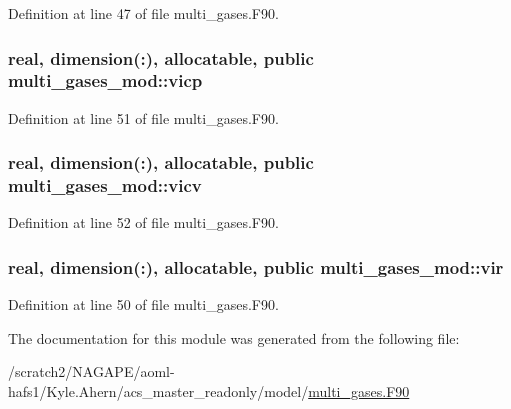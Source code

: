 Definition at line 47 of file multi\-\_\-gases.\-F90.

\subsubsection[{vicp}]{\setlength{\rightskip}{0pt plus 5cm}real, dimension(\-:), allocatable, public multi\-\_\-gases\-\_\-mod\-::vicp}\label{classmulti__gases__mod_a3e01739eaf6bc27d9db8770ec4c9cd69}


Definition at line 51 of file multi\-\_\-gases.\-F90.

\subsubsection[{vicv}]{\setlength{\rightskip}{0pt plus 5cm}real, dimension(\-:), allocatable, public multi\-\_\-gases\-\_\-mod\-::vicv}\label{classmulti__gases__mod_a4a8d9ed9352b8bfd8daa59b36ab2430f}


Definition at line 52 of file multi\-\_\-gases.\-F90.

\subsubsection[{vir}]{\setlength{\rightskip}{0pt plus 5cm}real, dimension(\-:), allocatable, public multi\-\_\-gases\-\_\-mod\-::vir}\label{classmulti__gases__mod_a39e5146fa83f5edbe8479cd345968d9c}


Definition at line 50 of file multi\-\_\-gases.\-F90.



The documentation for this module was generated from the following file\-:\begin{DoxyCompactItemize}
\item 
/scratch2/\-N\-A\-G\-A\-P\-E/aoml-\/hafs1/\-Kyle.\-Ahern/acs\-\_\-master\-\_\-readonly/model/\hyperlink{multi__gases_8F90}{multi\-\_\-gases.\-F90}\end{DoxyCompactItemize}
